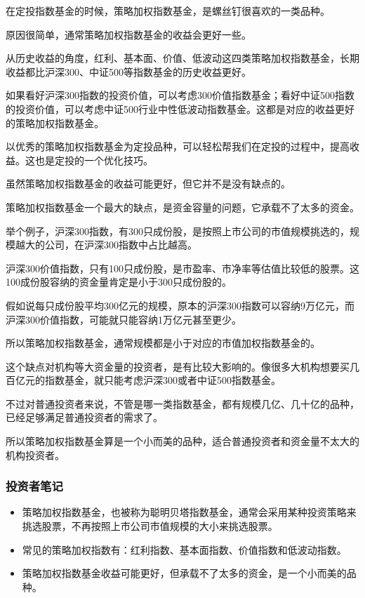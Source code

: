 在定投指数基金的时候，策略加权指数基金，是螺丝钉很喜欢的一类品种。

原因很简单，通常策略加权指数基金的收益会更好一些。

从历史收益的角度，红利、基本面、价值、低波动这四类策略加权指数基金，长期收益都比沪深300、中证500等指数基金的历史收益更好。

如果看好沪深300指数的投资价值，可以考虑300价值指数基金；看好中证500指数的投资价值，可以考虑中证500行业中性低波动指数基金。这都是对应的收益更好的策略加权指数基金。

以优秀的策略加权指数基金为定投品种，可以轻松帮我们在定投的过程中，提高收益。这也是定投的一个优化技巧。

虽然策略加权指数基金的收益可能更好，但它并不是没有缺点的。

策略加权指数基金一个最大的缺点，是资金容量的问题，它承载不了太多的资金。

举个例子，沪深300指数，有300只成份股，是按照上市公司的市值规模挑选的，规模越大的公司，在沪深300指数中占比越高。

沪深300价值指数，只有100只成份股，是市盈率、市净率等估值比较低的股票。这100成份股容纳的资金量肯定是小于300只成份股的。

假如说每只成份股平均300亿元的规模，原本的沪深300指数可以容纳9万亿元，而沪深300价值指数，可能就只能容纳1万亿元甚至更少。

所以策略加权指数基金，通常规模都是小于对应的市值加权指数基金的。

这个缺点对机构等大资金量的投资者，是有比较大影响的。像很多大机构想要买几百亿元的指数基金，就只能考虑沪深300或者中证500指数基金。

不过对普通投资者来说，不管是哪一类指数基金，都有规模几亿、几十亿的品种，已经足够满足普通投资者的需求了。

所以策略加权指数基金算是一个小而美的品种，适合普通投资者和资金量不太大的机构投资者。

\subsubsection{投资者笔记}

\begin{itemize}
\item {\kaishu 策略加权指数基金，也被称为聪明贝塔指数基金，通常会采用某种投资策略来挑选股票，不再按照上市公司市值规模的大小来挑选股票。}
\item {\kaishu 常见的策略加权指数有：红利指数、基本面指数、价值指数和低波动指数。}
\item {\kaishu 策略加权指数基金收益可能更好，但承载不了太多的资金，是一个小而美的品种。}
\end{itemize}

